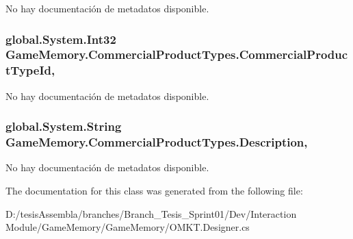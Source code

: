 No hay documentación de metadatos disponible. 

\hypertarget{class_game_memory_1_1_commercial_product_types_a259bcdf4dd877d8bae773e9c24bfe00d}{
\subsubsection[{Commercial\-Product\-Type\-Id}]{\setlength{\rightskip}{0pt plus 5cm}global.\-System.\-Int32 Game\-Memory.\-Commercial\-Product\-Types.\-Commercial\-Product\-Type\-Id\hspace{0.3cm}{\ttfamily [get]}, {\ttfamily [set]}}}\label{class_game_memory_1_1_commercial_product_types_a259bcdf4dd877d8bae773e9c24bfe00d}


No hay documentación de metadatos disponible. 

\hypertarget{class_game_memory_1_1_commercial_product_types_a299effbd9ebde73b5faea55c63276e12}{
\subsubsection[{Description}]{\setlength{\rightskip}{0pt plus 5cm}global.\-System.\-String Game\-Memory.\-Commercial\-Product\-Types.\-Description\hspace{0.3cm}{\ttfamily [get]}, {\ttfamily [set]}}}\label{class_game_memory_1_1_commercial_product_types_a299effbd9ebde73b5faea55c63276e12}


No hay documentación de metadatos disponible. 



The documentation for this class was generated from the following file\-:\begin{DoxyCompactItemize}
\item 
D\-:/tesis\-Assembla/branches/\-Branch\-\_\-\-Tesis\-\_\-\-Sprint01/\-Dev/\-Interaction Module/\-Game\-Memory/\-Game\-Memory/O\-M\-K\-T.\-Designer.\-cs\end{DoxyCompactItemize}
